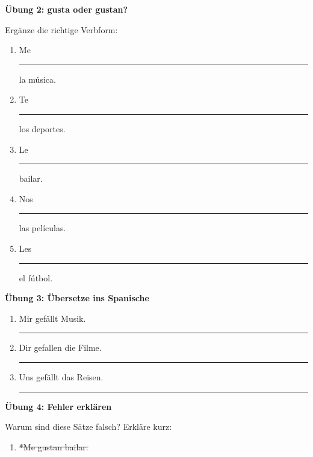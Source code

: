 \documentclass[10pt, a4paper]{article}
\newcommand{\fachfarbe}{spanisch}
\newcommand{\luecke}[1]{\rule{#1}{0.4pt}}
\newcommand{\abschnitt}[1]{%
    \vspace{8pt}
    \noindent\textbf{\textcolor{\fachfarbe}{#1}}
    \vspace{4pt}
}
\begin{document}
\begin{multicols}{2}
\vspace{8pt}


\abschnitt{Übung 2: gusta oder gustan?}

Ergänze die richtige Verbform:

\vspace{4pt}

\begin{enumerate}[leftmargin=2em]
\item Me \luecke{1.5cm} la música.
\item Te \luecke{1.5cm} los deportes.
\item Le \luecke{1.5cm} bailar.
\item Nos \luecke{1.5cm} las películas.
\item Les \luecke{1.5cm} el fútbol.
\end{enumerate}

\vspace{8pt}


\abschnitt{Übung 3: Übersetze ins Spanische}

\vspace{4pt}

\begin{enumerate}[leftmargin=2em]
\item Mir gefällt Musik. \luecke{4cm}
\item Dir gefallen die Filme. \luecke{4cm}
\item Uns gefällt das Reisen. \luecke{4cm}
\end{enumerate}

\vspace{6pt}


\abschnitt{Übung 4: Fehler erklären}

Warum sind diese Sätze falsch? Erkläre kurz:

\vspace{4pt}

\begin{enumerate}[leftmargin=2em]
\item \textcolor{fehler}{\sout{*Me gustan bailar.}}


\end{enumerate}
\end{multicols}
\end{document}
